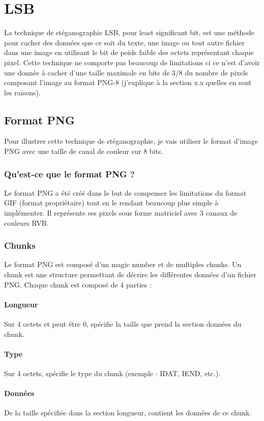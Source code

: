 \newpage
\section{LSB}
La technique de stéganographie LSB, pour least significant bit, est une méthode pour cacher des données que ce soit du texte, une image ou tout autre fichier dans une image en utilisant le bit de poids faible des octets représentant chaque pixel.
\newline
Cette technique ne comporte pas beaucoup de limitations ci ce n'est d'avoir une donnée à cacher d'une taille maximale en bits de 3/8 du nombre de pixels composant l'image au format PNG-8 (j'explique à la section x.x quelles en sont les raisons).

\subsection{Format PNG}
Pour illustrer cette technique de stéganographie, je vais utiliser le format d'image PNG avec une taille de canal de couleur sur 8 bits.

\subsubsection{Qu'est-ce que le format PNG ?}
Le format PNG a été créé dans le but de compenser les limitations du format GIF (format propriétaire) tout en le rendant beaucoup plus simple à implémenter. Il représente ses pixels sous forme matriciel avec 3 canaux de couleurs RVB.

\subsubsection{Chunks}
Le format PNG est composé d'un magic number et de multiples chunks. Un chunk est une structure permettant de décrire les différentes données d'un fichier PNG. Chaque chunk est composé de 4 parties :
\paragraph{Longueur}
Sur 4 octets et peut être 0, spécifie la taille que prend la section données du chunk.
\paragraph{Type}
Sur 4 octets, spécifie le type du chunk (exemple : IDAT, IEND, etc.).
\paragraph{Données}
De la taille spécifiée dans la section longueur, contient les données de ce chunk.
